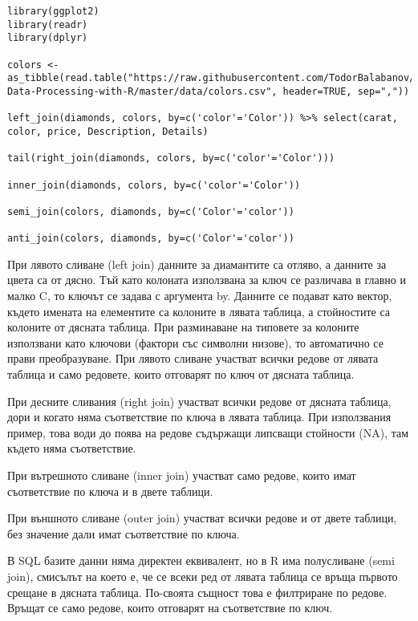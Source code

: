 \begin{lstlisting}[caption=Сложни сливания, label=listing0141]
library(ggplot2)
library(readr)
library(dplyr)

colors <- as_tibble(read.table("https://raw.githubusercontent.com/TodorBalabanov/Statistical-Data-Processing-with-R/master/data/colors.csv", header=TRUE, sep=","))

left_join(diamonds, colors, by=c('color'='Color')) %>% select(carat, color, price, Description, Details)

tail(right_join(diamonds, colors, by=c('color'='Color')))

inner_join(diamonds, colors, by=c('color'='Color'))

semi_join(colors, diamonds, by=c('Color'='color'))

anti_join(colors, diamonds, by=c('Color'='color'))
\end{lstlisting}

При лявото сливане (left join) данните за диамантите са отляво, а данните за цвета са от дясно. Тъй като колоната използвана за ключ се различава в главно и малко C, то ключът се задава с аргумента by. Данните се подават като вектор, където имената на елементите са колоните в лявата таблица, а стойностите са колоните от дясната таблица. При разминаване на типовете за колоните използвани като ключови (фактори със символни низове), то автоматично се прави преобразуване. При лявото сливане участват всички редове от лявата таблица и само редовете, които отговарят по ключ от дясната таблица. 

При десните сливания (right join) участват всички редове от дясната таблица, дори и когато няма съответствие по ключа в лявата таблица. При използвания пример, това води до поява на редове съдържащи липсващи стойности (NA), там където няма съответствие.

При вътрешното сливане (inner join) участват само редове, които имат съответствие по ключа и в двете таблици. 

При външното сливане (outer join) участват всички редове и от двете таблици, без значение дали имат съответствие по ключа.

В SQL базите данни няма директен еквивалент, но в R има полусливане (semi join), смисълът на което е, че се всеки ред от лявата таблица се връща първото срещане в дясната таблица. По-своята същност това е филтриране по редове. Връщат се само редове, които отговарят на съответствие по ключ. 

